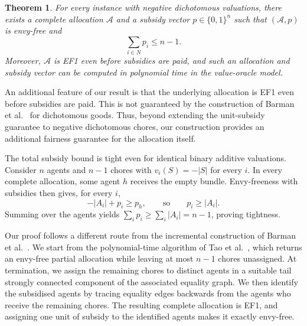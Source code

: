 \documentclass[11pt]{article}
\theoremstyle{plain}
\newtheorem*{theorem*}{Theorem}
\theoremstyle{plain}
\begin{document}
\begin{theorem*}
For every instance with negative dichotomous valuations, there exists a complete allocation $\mathcal A$ and a subsidy vector
$p\in\{0,1\}^n$ such that $(\mathcal A,p)$ is envy-free and
\[
    \sum_{i\in N} p_i\le n-1.
\]
Moreover, $\mathcal A$ is EF1 even before subsidies are paid, and such an allocation and subsidy vector can be computed in polynomial time in the value-oracle model.
\end{theorem*}
An additional feature of our result is that the underlying allocation is EF1 even before subsidies are paid. This is not guaranteed by the construction of Barman et al.~\cite{BKNS22} for dichotomous goods. Thus, beyond extending the unit-subsidy guarantee to negative dichotomous chores, our construction provides an additional fairness guarantee for the allocation itself.

The total subsidy bound is tight even for identical binary additive valuations. Consider $n$ agents and $n-1$ chores with $v_i(S)=-|S|$ for every $i$. In every complete allocation, some agent $h$ receives the empty bundle. Envy-freeness with subsidies then gives, for every $i$,
\[
    -|A_i|+p_i\ge p_h,
    \qquad\text{so}\qquad
    p_i\ge |A_i|.
\]
Summing over the agents yields
$\sum_i p_i\ge\sum_i|A_i|=n-1$, proving tightness.



Our proof follows a different route from the incremental construction of Barman et al.~\cite{BKNS22}. We start from the polynomial-time algorithm of Tao et al.~\cite{tao2025existence}, which returns an envy-free partial allocation while leaving at most $n-1$ chores unassigned. At termination, we assign the remaining chores to distinct agents in a suitable tail strongly connected component of the associated equality graph. We then identify the subsidised agents by tracing equality edges backwards from the agents who receive the remaining chores. The resulting complete allocation is EF1, and assigning one unit of subsidy to the identified agents makes it exactly envy-free.
\end{document}
